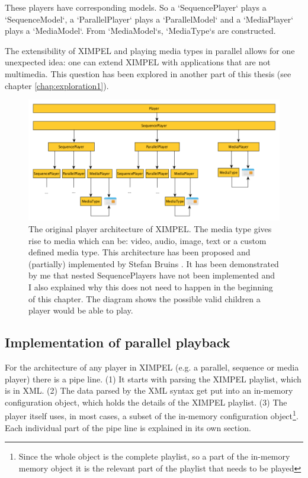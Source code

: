These players have corresponding models. So a `SequencePlayer` plays a `SequenceModel`, a `ParallelPlayer` plays a `ParallelModel` and a `MediaPlayer` plays a `MediaModel`. From `MediaModel`s, `MediaType`s are constructed.

The extensibility of XIMPEL and playing media types in parallel allows for one unexpected idea: one can extend XIMPEL with applications that are not multimedia. This question has been explored in another part of this thesis (see chapter \ref{chap:exploration1}).

\begin{figure}
\centering
\includegraphics[width=1.35\textwidth, center]{ximpel_original_player_architecture.png} %
\caption{The original player architecture of XIMPEL. The media type gives rise to media which can be: video, audio, image, text or a custom defined media type. This architecture has been proposed and (partially) implemented by Stefan Bruins \cite{stefan2016}. It has been demonstrated by me that nested SequencePlayers have not been implemented and I also explained why this does not need to happen in the beginning of this chapter. The diagram shows the possible valid children a player would be able to play.}
\label{fig:original_architecture}
\end{figure}

\subsection{Implementation of parallel playback}
For the architecture of any player in XIMPEL (e.g. a parallel, sequence or media player) there is a pipe line. (1) It starts with parsing the XIMPEL playlist, which is in XML. (2) The data parsed by the XML syntax get put into an in-memory configuration object, which holds the details of the XIMPEL playlist. (3) The player itself uses, in most cases, a subset of the in-memory configuration object\footnote{Since the whole object is the complete playlist, so a part of the in-memory memory object it is the relevant part of the playlist that needs to be played}. Each individual part of the pipe line is explained in its own section.

